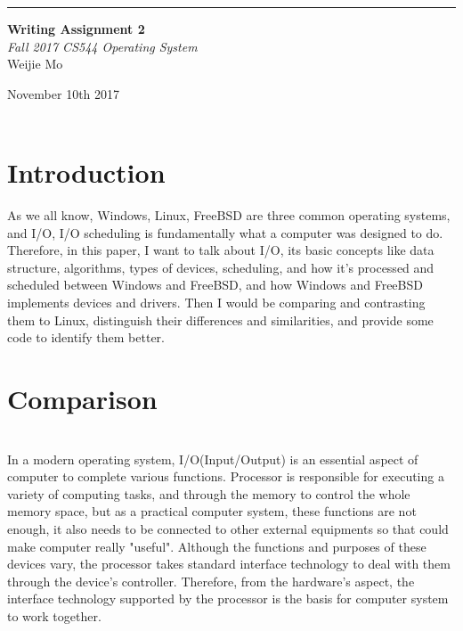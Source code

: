 \documentclass[10pt,draftclsnofoot,peerreview,letterpaper,onecolumn,]{IEEEtran}
\begin{document}
\begin{titlepage} %
	
	\raggedleft %
	
	\rule{1pt}{\textheight} %
	\hspace{0.05\textwidth} %
	\parbox[b]{0.75\textwidth}{ %
		
		{\Huge\bfseries Writing Assignment 2 }\\[2\baselineskip] %
		{\large\textit{Fall 2017 CS544 Operating System}}\\[4\baselineskip] %
		{\Large Weijie Mo} %
		
		\vspace{0.5\textheight} %
		
		{\noindent November 10th 2017}\\[\baselineskip] %
        {\noindent }\\[\baselineskip] %
	}

\end{titlepage}

\section{Introduction}

As we all know, Windows, Linux, FreeBSD are three common operating systems, and I/O, I/O scheduling is fundamentally what a computer was designed to do. Therefore, in this paper, I want to talk about I/O, its basic concepts like data structure, algorithms, types of devices, scheduling, and how it’s processed and scheduled between Windows and FreeBSD, and how Windows and FreeBSD implements devices and drivers. Then I would be comparing and contrasting them to Linux, distinguish their differences and similarities, and provide some code to identify them better.
\section{Comparison}
~\\In a modern operating system, I/O(Input/Output) is an essential aspect of computer to complete various functions. Processor is responsible for executing a variety of computing tasks, and through the memory to control the whole memory space, but as a practical computer system, these functions are not enough, it also needs to be connected to other external equipments so that could make computer really "useful". Although the functions and purposes of these devices vary, the processor takes standard interface technology to deal with them through the device's controller. Therefore, from the hardware’s aspect, the interface technology supported by the processor is the basis for computer system to work together.
\end{document}
